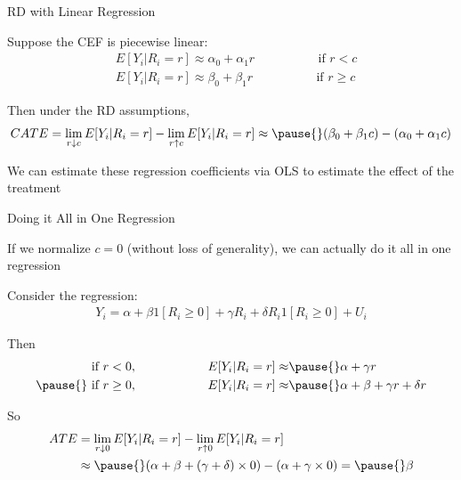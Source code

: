 \documentclass[11pt,english,handout]{beamer}
\newenvironment{wideitemize}{\itemize\addtolength{\itemsep}{10pt}}{\enditemize}
\begin{document}
\begin{frame}{RD with Linear Regression}
	\begin{wideitemize}
		\item
		Suppose the CEF is piecewise linear:
		\begin{align*}
			& E[Y_i | R_i = r] \approx \alpha_0 + \alpha_1 r  \hspace{2cm} \text{ if } r <c \\
			& E[Y_i | R_i = r] \approx \beta_0 + \beta_1 r \hspace{2cm} \text{ if }  r \geq c
		\end{align*}
	
	\pause
	\item
	Then under the RD assumptions, 
	$$CATE = \lim_{r \downarrow c} E[Y_{i} | R_i = r] - \lim_{r \uparrow c} E[Y_{i} | R_i = r] \approx \pause{} (\beta_0 + \beta_1 c) - (\alpha_0 + \alpha_1 c) $$
	\pause
	\item
	We can estimate these regression coefficients via OLS to estimate the effect of the treatment
	\end{wideitemize}
\end{frame}

\begin{frame}{Doing it All in One Regression}
	\begin{wideitemize}
		\item
		If we normalize $c=0$ (without loss of generality), we can actually do it all in one regression
		
		\pause
		\item
		Consider the regression:
		\begin{align*}
			Y_i  = \alpha +  \beta 1[R_i \geq 0]  + \gamma R_i  + \delta  R_i 1[R_i \geq 0 ]  + U_i
		\end{align*}
		
		\pause
		\item
		Then
		\begin{align*}
			  \text{ if } r <0, \hspace{2cm} E[Y_i | R_i = r] \approx & \pause{} \alpha + \gamma r   \\ \pause{}
			 \text{ if }  r \geq 0, \hspace{2cm} E[Y_i | R_i = r] \approx & \pause{} \alpha + \beta  + \gamma r + \delta r 
		\end{align*}
		 
		\pause
		\item
		So 
		\begin{align*}
			ATE& = \lim_{r \downarrow 0} E[Y_{i} | R_i = r] - \lim_{r \uparrow 0} E[Y_{i} | R_i = r] \\
			&\approx \pause{} (\alpha  + \beta + (\gamma + \delta) \times 0 ) - (\alpha + \gamma \times 0 ) = \pause{} \beta 
		\end{align*} 
	\end{wideitemize}
\end{frame}
\end{document}
